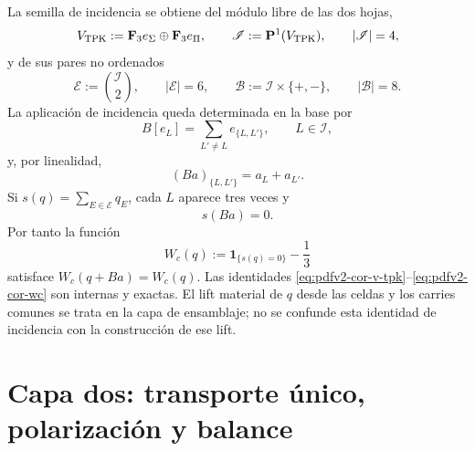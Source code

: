 La semilla de incidencia se obtiene del módulo libre de las dos hojas,
\begin{equation}
\label{eq:pdfv2-cor-v-tpk}
 V_{\rm TPK}:=\mathbf F_3e_\Sigma\oplus\mathbf F_3e_\Pi,
 \qquad
 \mathscr I:=\mathbf P^1(V_{\rm TPK}),
 \qquad |\mathscr I|=4,
\end{equation}
y de sus pares no ordenados
\begin{equation}
\label{eq:pdfv2-cor-incidencias}
 \mathscr E:=\binom{\mathscr I}{2},
 \qquad |\mathscr E|=6,
 \qquad
 \mathscr B:=\mathscr I\times\{+,-\},
 \qquad |\mathscr B|=8.
\end{equation}
La aplicación de incidencia queda determinada en la base por
\begin{equation}
\label{eq:pdfv2-cor-b-incidencia-generadores}
 B[e_L]=\sum_{L'\neq L}e_{\{L,L'\}},
 \qquad L\in\mathscr I,
\end{equation}
y, por linealidad,
\begin{equation}
\label{eq:pdfv2-cor-b-incidencia-coordenadas}
 (Ba)_{\{L,L'\}}=a_L+a_{L'}.
\end{equation}
Si \(s(q)=\sum_{E\in\mathscr E}q_E\), cada \(L\) aparece tres veces y
\begin{equation}
\label{eq:pdfv2-cor-sb-cero}
 s(Ba)=0.
\end{equation}
Por tanto la función
\begin{equation}
\label{eq:pdfv2-cor-wc}
 W_c(q):=\mathbf1_{\{s(q)=0\}}-\frac13
\end{equation}
satisface \(W_c(q+Ba)=W_c(q)\). Las identidades
\eqref{eq:pdfv2-cor-v-tpk}--\eqref{eq:pdfv2-cor-wc} son internas y exactas.
El lift material de \(q\) desde las celdas y los carries comunes se trata en
la capa de ensamblaje; no se confunde esta identidad de incidencia con la
construcción de ese lift.

\section{Capa dos: transporte único, polarización y balance}

